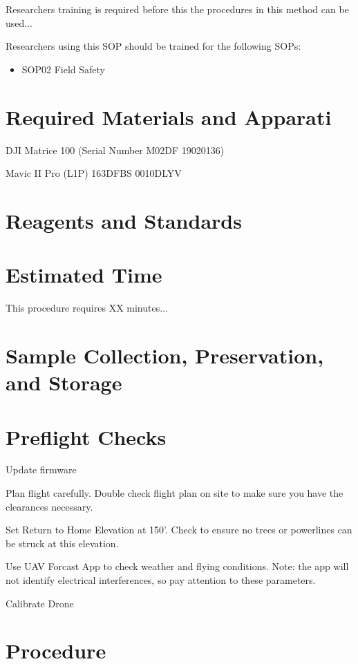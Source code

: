 \documentclass[12pt]{../SOP4_alpha}\usepackage[]{graphicx}\usepackage[]{color}
\begin{document}
\NP Researchers training is required before this the procedures in this method can be used... 

\NP Researchers using this SOP should be trained for the following SOPs:

\begin{itemize}
  \item SOP02 Field Safety
\end{itemize}

\section{Required Materials and Apparati}

\NP DJI Matrice 100 (Serial Number M02DF 19020136)

\NP Mavic II Pro (L1P) 163DFBS 0010DLYV

\section{Reagents and Standards}

\section{Estimated Time}

\NP This procedure requires XX minutes...

\section{Sample Collection, Preservation, and Storage}

\section{Preflight Checks}

\NP Update firmware

\NP Plan flight carefully. Double check flight plan on site to make sure you have the clearances necessary. 

\NP Set Return to Home Elevation at 150'. Check to ensure no trees or powerlines can be struck at this elevation. 

\NP Use UAV Forcast App to check weather and flying conditions. Note: the app will not identify electrical interferences, so pay attention to these parameters. 

\NP Calibrate Drone

\section{Procedure}
\end{document}
